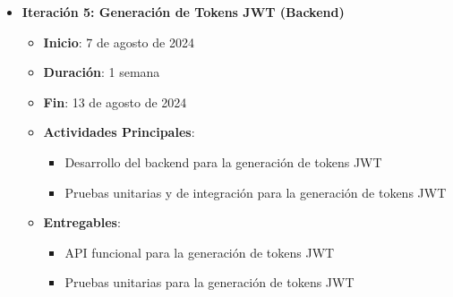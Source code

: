 \documentclass{article}
\begin{document}
\begin{itemize}
\begin{itemize}
              \item \textbf{Iteración 5: Generación de Tokens JWT (Backend)}
                    \begin{itemize}
                        \item \textbf{Inicio}: 7 de agosto de 2024
                        \item \textbf{Duración}: 1 semana
                        \item \textbf{Fin}: 13 de agosto de 2024
                        \item \textbf{Actividades Principales}:
                              \begin{itemize}
                                  \item Desarrollo del backend para la generación de tokens JWT
                                  \item Pruebas unitarias y de integración para la generación de tokens JWT
                              \end{itemize}
                        \item \textbf{Entregables}:
                              \begin{itemize}
                                  \item API funcional para la generación de tokens JWT
                                  \item Pruebas unitarias para la generación de tokens JWT
                              \end{itemize}
                    \end{itemize}


\end{itemize}
\end{itemize}
\end{document}
